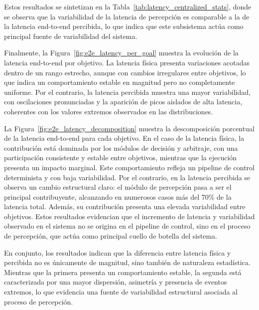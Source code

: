 Estos resultados se sintetizan en la Tabla~\ref{tab:latency_centralized_stats}, donde se observa que la variabilidad de la latencia de percepción
es comparable a la de la latencia end-to-end percibida, lo que indica que este subsistema actúa como 
principal fuente de variabilidad del sistema.

Finalmente, la Figura~\ref{fig:e2e_latency_per_goal} muestra la evolución de la latencia end-to-end por objetivo. 
La latencia física presenta variaciones acotadas dentro de un rango estrecho, aunque con cambios irregulares entre objetivos, lo que indica un comportamiento estable en magnitud pero no completamente uniforme.
Por el contrario, la latencia percibida muestra una mayor variabilidad, con oscilaciones pronunciadas y la aparición de picos aislados de alta latencia, coherentes con los valores extremos observados en las distribuciones.

La Figura~\ref{fig:e2e_latency_decomposition} muestra la descomposición porcentual de la latencia end-to-end para cada objetivo.
En el caso de la latencia física, la contribución está dominada por los módulos de decisión y arbitraje, con una participación consistente y estable entre objetivos, mientras que la ejecución presenta un impacto marginal. Este comportamiento refleja un pipeline de control determinista y con baja variabilidad.
Por el contrario, en la latencia percibida se observa un cambio estructural claro: el módulo de percepción pasa a ser el principal contribuyente, alcanzando en numerosos casos más del 70\% de la latencia total. Además, su contribución presenta una elevada variabilidad entre objetivos.
Estos resultados evidencian que el incremento de latencia y variabilidad observado en el sistema no se origina en el pipeline de control, sino en el proceso de percepción, que actúa como principal cuello de botella del sistema.

En conjunto, los resultados indican que la diferencia entre latencia física y percibida no es únicamente de magnitud, 
sino también de naturaleza estadística. Mientras que la primera presenta un comportamiento estable, la segunda está 
caracterizada por una mayor dispersión, asimetría y presencia de eventos extremos, lo que evidencia una fuente de 
variabilidad estructural asociada al proceso de percepción.